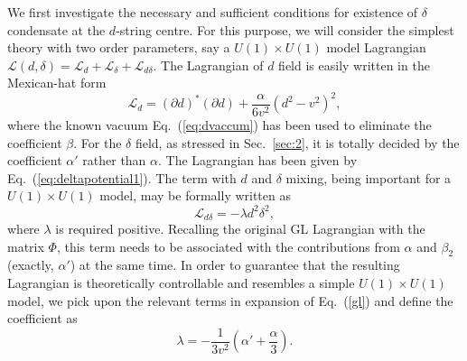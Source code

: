 \documentclass[prd, showpacs,nofootinbib,amsmath,amssymb]{revtex4}
\begin{document}
We first investigate the necessary and sufficient conditions for existence of $\delta$ condensate
at the $d$-string centre.
For this purpose, we will consider the simplest theory with two order parameters, say
a $U(1) \times U(1)$ model Lagrangian $\mathcal{L}(d,\delta)= \mathcal{L}_d +
\mathcal{L}_\delta + \mathcal{L}_{d\delta}$.
The Lagrangian of $d$ field is easily written in the Mexican-hat form
\begin{equation}
  \label{eq:vortonb}
  \mathcal{L}_d  = (\partial d)^* (\partial d) +\frac{\alpha}{6 v^2}(d^2 - v^2)^2,
\end{equation}
where the known vacuum Eq.~(\ref{eq:dvaccum}) has been used to eliminate the coefficient $\beta$.
For the $\delta$ field, as stressed in Sec.~\ref{sec:2}, it is totally decided by the coefficient
$\alpha'$ rather than $\alpha$. The Lagrangian has been given by Eq.~(\ref{eq:deltapotential1}). 
The term with $d$ and $\delta$ mixing, being important for a $U(1) \times U(1)$ model,  may be formally written as
\begin{equation}
  \label{eq:vortoninter}
  \mathcal{L}_{d\delta} = -\lambda d^2 \delta^2,
\end{equation}
where $\lambda$ is required positive.
Recalling the original GL Lagrangian with the matrix $\Phi$, this term needs to
be associated with the contributions from $\alpha$ and $\beta_2$ (exactly, $\alpha'$) at the same time. In order to guarantee
that the resulting Lagrangian is theoretically controllable and resembles a
simple $U(1) \times U(1)$ model, we pick upon the relevant terms
in expansion of Eq.~(\ref{gl}) and define the coefficient as
\begin{equation}
  \label{eq:vortoninter1}
  \lambda = -\frac{1}{3 v^2}(\alpha' +\frac{\alpha}{3}).
\end{equation}
\end{document}

